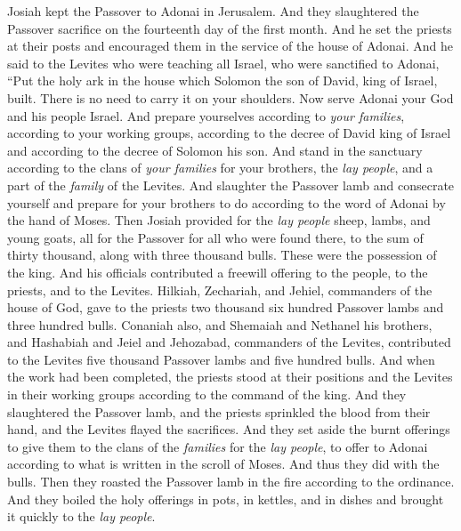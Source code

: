 \begin{biblechapter} %
 Josiah kept the Passover to Adonai in Jerusalem. And they slaughtered the Passover sacrifice on the fourteenth day of the first month.
\verse And he set the priests at their posts and encouraged them in the service of the house of Adonai.
\verse And he said to the Levites who were teaching all Israel, who were sanctified to Adonai, “Put the holy ark in the house which Solomon the son of David, king of Israel, built. There is no need to carry it on your shoulders. Now serve Adonai your God and his people Israel.
\verse And prepare yourselves according to \textit{your families}, according to your working groups, according to the decree of David king of Israel and according to the decree of Solomon his son.
\verse And stand in the sanctuary according to the clans of \textit{your families} for your brothers, the \textit{lay people}, and a part of the \textit{family} of the Levites.
\verse And slaughter the Passover lamb and consecrate yourself and prepare for your brothers to do according to the word of Adonai by the hand of Moses.
\verse Then Josiah provided for the \textit{lay people} sheep, lambs, and young goats, all for the Passover for all who were found there, to the sum of thirty thousand, along with three thousand bulls. These were the possession of the king.
\verse And his officials contributed a freewill offering to the people, to the priests, and to the Levites. Hilkiah, Zechariah, and Jehiel, commanders of the house of God, gave to the priests two thousand six hundred Passover lambs and three hundred bulls.
\verse Conaniah also, and Shemaiah and Nethanel his brothers, and Hashabiah and Jeiel and Jehozabad, commanders of the Levites, contributed to the Levites five thousand Passover lambs and five hundred bulls.
\verse And when the work had been completed, the priests stood at their positions and the Levites in their working groups according to the command of the king.
\verse And they slaughtered the Passover lamb, and the priests sprinkled the blood from their hand, and the Levites flayed the sacrifices.
\verse And they set aside the burnt offerings to give them to the clans of the \textit{families} for the \textit{lay people}, to offer to Adonai according to what is written in the scroll of Moses. And thus they did with the bulls.
\verse Then they roasted the Passover lamb in the fire according to the ordinance. And they boiled the holy offerings in pots, in kettles, and in dishes and brought it quickly to the \textit{lay people}.

\end{biblechapter}
